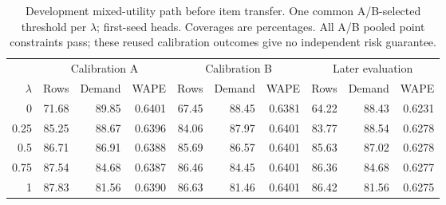 \begin{table}[htbp]
\centering\small\setlength{\tabcolsep}{3.2pt}
\caption{Development mixed-utility path before item transfer. One common A/B-selected threshold per $\lambda$; first-seed heads. Coverages are percentages. All A/B pooled point constraints pass; these reused calibration outcomes give no independent risk guarantee.}
\label{tab:mixed-development}
\begin{tabular}{r rrr rrr rrr}\toprule
&\multicolumn{3}{c}{Calibration A}&\multicolumn{3}{c}{Calibration B}&\multicolumn{3}{c}{Later evaluation}\\
$\lambda$&Rows&Demand&WAPE&Rows&Demand&WAPE&Rows&Demand&WAPE\\\midrule
0 & 71.68 & 89.85 & 0.6401 & 67.45 & 88.45 & 0.6381 & 64.22 & 88.43 & 0.6231\\
0.25 & 85.25 & 88.67 & 0.6396 & 84.06 & 87.97 & 0.6401 & 83.77 & 88.54 & 0.6278\\
0.5 & 86.71 & 86.91 & 0.6388 & 85.69 & 86.57 & 0.6401 & 85.63 & 87.02 & 0.6278\\
0.75 & 87.54 & 84.68 & 0.6387 & 86.46 & 84.45 & 0.6401 & 86.36 & 84.68 & 0.6277\\
1 & 87.83 & 81.56 & 0.6390 & 86.63 & 81.46 & 0.6401 & 86.42 & 81.56 & 0.6275\\
\bottomrule\end{tabular}
\end{table}
